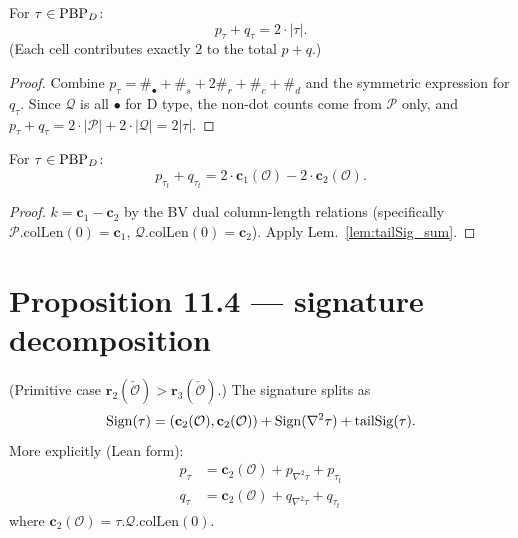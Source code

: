 \begin{lemma}
  \label{lem:sig_sum_D}
  \leanok
  For $\tau \in \mathrm{PBP}_D$:
  \[ p_\tau + q_\tau = 2\cdot|\tau|. \]
  (Each cell contributes exactly $2$ to the total $p + q$.)
\end{lemma}
\begin{proof}
  \leanok
  Combine $p_\tau = \#_\bullet + \#_s + 2\#_r + \#_c + \#_d$ and the symmetric expression for $q_\tau$. Since $\mathcal{Q}$ is all $\bullet$ for D type, the non-dot counts come from $\mathcal{P}$ only, and $p_\tau + q_\tau = 2 \cdot |\mathcal{P}| + 2 \cdot |\mathcal{Q}| = 2|\tau|$.
\end{proof}

\begin{lemma}
  \label{lem:residual_D}
  \leanok
  For $\tau \in \mathrm{PBP}_D$:
  \[ p_{\tau_t} + q_{\tau_t} = 2 \cdot \mathbf{c}_1(\mathcal{O}) - 2 \cdot \mathbf{c}_2(\mathcal{O}). \]
\end{lemma}
\begin{proof}
  \leanok
  $k = \mathbf{c}_1 - \mathbf{c}_2$ by the BV dual column-length relations (specifically $\mathcal{P}.\mathrm{colLen}(0) = \mathbf{c}_1$, $\mathcal{Q}.\mathrm{colLen}(0) = \mathbf{c}_2$). Apply Lem.~\ref{lem:tailSig_sum}.
\end{proof}

\section{Proposition 11.4 — signature decomposition}

\begin{proposition}
  \label{prop:11_4}
  \leanok
  (Primitive case $\mathbf{r}_2(\check{\mathcal{O}}) > \mathbf{r}_3(\check{\mathcal{O}})$.) The signature splits as
  \[ \mathrm{Sign}(\tau) = (\mathbf{c}_2(\mathcal{O}), \mathbf{c}_2(\mathcal{O})) + \mathrm{Sign}(\nabla^2\tau) + \mathrm{tailSig}(\tau). \]
  More explicitly (Lean form):
  \begin{align*}
    p_\tau &= \mathbf{c}_2(\mathcal{O}) + p_{\nabla^2\tau} + p_{\tau_t} \\
    q_\tau &= \mathbf{c}_2(\mathcal{O}) + q_{\nabla^2\tau} + q_{\tau_t}
  \end{align*}
  where $\mathbf{c}_2(\mathcal{O}) = \tau.\mathcal{Q}.\mathrm{colLen}(0)$.
\end{proposition}


